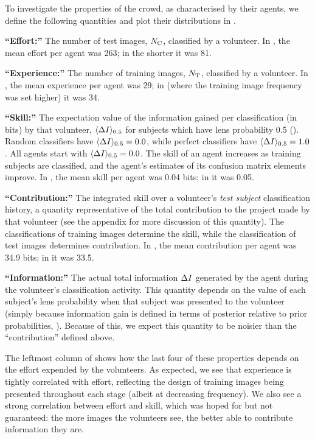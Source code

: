 \documentclass[useAMS,usenatbib,a4paper]{mn2e}
\begin{document}
To investigate the properties of the \sw crowd, as characterised by their
agents, we define the following quantities and plot their distributions in
.
%
\begin{description}
%
\item{\noindent\bf ``Effort:''} The number of test images, $N_{\rm C}$, classified
by a volunteer. In \StageOne, the mean effort per agent was 263; in the shorter
\StageTwo it was 81.
%
\item{\noindent\bf ``Experience:''} The number of training images, $N_{\rm T}$,
classified by a volunteer. In \StageOne, the mean experience per agent was 29;
in \StageTwo (where the training image frequency was set higher) it was 34.
%
\item{\noindent\bf ``Skill:''} The expectation value of the information gained
per classification (in bits) by that volunteer,  ${\langle \Delta I \rangle_{0.5}}$ for subjects which
have lens probability 0.5 (). Random classifiers have
${\langle \Delta I \rangle_{0.5}} = 0.0$, while perfect classifiers have ${\langle \Delta I \rangle_{0.5}} = 1.0$. All agents start
with ${\langle \Delta I \rangle_{0.5}} = 0.0$. The skill of  an agent increases as training subjects are
classified, and the agent's estimates of its confusion matrix elements improve.
In \StageOne, the mean skill per agent was 0.04 bits; in  \StageTwo it was 0.05.
%
\item{\noindent\bf ``Contribution:''} The integrated skill over a volunteer's
{\it test subject} classification history, a quantity representative of the
total contribution to the project made by that volunteer (see the appendix for
more discussion of this quantity). The classifications of training images
determine the skill, while the classification of test images determines
contribution.  In \StageOne, the mean  contribution per agent was
34.9 bits; in \StageTwo it was 33.5.
%
\item{\noindent\bf ``Information:''} The actual total information $\Delta I$
generated by the agent during the volunteer's classification activity. This
quantity depends on the value of each subject's lens probability when that
subject was presented to the volunteer (simply because information gain is
defined in terms of posterior relative to prior probabilities,
).  Because of this, we expect this quantity to be noisier
than the ``contribution'' defined above.
%
\end{description}

The leftmost column of  shows how the last four of
these properties depends on the effort expended by the volunteers. As expected,
we see that experience is tightly correlated with effort, reflecting the design
of training images being presented throughout each stage (albeit at decreasing
frequency). We also see a strong correlation between effort and skill, which was
hoped for but not guaranteed: the more images the volunteers see, the better
able to contribute information they are.
\end{document}
